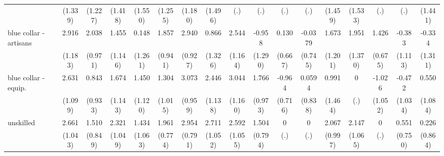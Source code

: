 {\begin{tabular}{l*{16}{c}}
                    &     (1.339)         &     (1.227)         &     (1.418)         &     (1.550)         &     (1.255)         &     (1.180)         &     (1.496)         &         (.)         &         (.)         &         (.)         &         (.)         &     (1.459)         &     (1.533)         &         (.)         &         (.)         &     (1.441)         \\
[1em]
blue collar - artisans&       2.916\sym{*}  &       2.038\sym{*}  &       1.455         &       0.148         &       1.857\sym{*}  &       2.940\sym{**} &       0.866         &       2.544\sym{*}  &      -0.958         &       0.130         &     -0.0379         &       1.673         &       1.951         &       1.426\sym{*}  &      -0.383         &      -0.334         \\
                    &     (1.183)         &     (0.971)         &     (1.146)         &     (1.261)         &     (0.941)         &     (0.927)         &     (1.326)         &     (1.164)         &     (1.290)         &     (0.667)         &     (0.745)         &     (1.201)         &     (1.370)         &     (0.675)         &     (1.113)         &     (1.311)         \\
[1em]
blue collar - equip.&       2.631\sym{*}  &       0.843         &       1.674         &       1.450         &       1.304         &       3.073\sym{**} &       2.446\sym{*}  &       3.044\sym{**} &       1.766         &      -0.964         &      0.0594         &       0.991         &           0         &      -1.026         &      -0.472         &       0.550         \\
                    &     (1.099)         &     (0.933)         &     (1.143)         &     (1.120)         &     (1.015)         &     (0.959)         &     (1.138)         &     (1.160)         &     (0.973)         &     (0.716)         &     (0.838)         &     (1.464)         &         (.)         &     (1.052)         &     (1.034)         &     (1.084)         \\
[1em]
unskilled           &       2.661\sym{*}  &       1.510         &       2.321\sym{*}  &       1.434         &       1.961\sym{*}  &       2.954\sym{***}&       2.711\sym{**} &       2.592\sym{*}  &       1.504         &           0         &           0         &       2.067\sym{*}  &       2.147\sym{*}  &           0         &       0.551         &       0.226         \\
                    &     (1.043)         &     (0.849)         &     (1.049)         &     (1.063)         &     (0.774)         &     (0.791)         &     (1.052)         &     (1.055)         &     (0.794)         &         (.)         &         (.)         &     (0.997)         &     (1.065)         &         (.)         &     (0.750)         &     (0.864)         \\

\end{tabular}}
